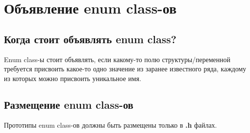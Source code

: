 \chapter{Объявление enum class-ов}\label{ec:h:0}
\section{Когда стоит объявлять enum class?}
Enum class-ы стоит объявлять, если какому-то полю структуры/переменной требуется присвоить какое-то одно значение из заранее известного ряда, каждому из которых можно присвоить уникальное имя.

\section{Размещение enum class-ов}
Прототипы enum class-ов должны быть размещены только в \textbf{.h} файлах.

